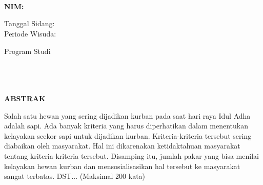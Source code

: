 %
%
%
%

\chapter*{\MakeUppercase{\judul}}

\fontsize{14}{16.8}
\begin{center}
	\vspace{0.3cm}
	\MakeUppercase{\textbf{\penulis}}\\
	\MakeUppercase{\textbf{NIM: \nim}}\\
	\fontsize{12}{14.4}
	\vspace{0.7cm}

	Tanggal Sidang: \tanggalSidang\\
	Periode Wisuda:\ \ \ \ \ \ \ \ \ \ \ \ \ \ \ \ \ \ \ \ \ \ \ \ \ \ \ \ \ \ \ \ \ \ \ \ \ \ 

	\vspace{0.7cm}
	Program Studi \programStudi\\
	\fakultas\\
	\universitas\\
	\alamatUniversitas\\

	\vspace{0.7cm}
\end{center}

\fontsize{12}{14.4}
\begin{center}\MakeUppercase{\textbf{Abstrak}}\end{center}

\noindent
\fontsize{10pt}{12pt}\selectfont
Salah satu hewan yang sering dijadikan kurban pada saat hari raya Idul Adha adalah sapi. Ada banyak kriteria yang harus diperhatikan dalam menentukan kelayakan seekor sapi untuk dijadikan kurban. Kriteria-kriteria tersebut sering diabaikan oleh masyarakat. Hal ini dikarenakan ketidaktahuan masyarakat tentang kriteria-kriteria tersebut. Disamping itu, jumlah pakar yang bisa menilai kelayakan hewan kurban dan mensosialisasikan hal tersebut ke masyarakat sangat terbatas. DST... (Maksimal 200 kata)\\
 \\
